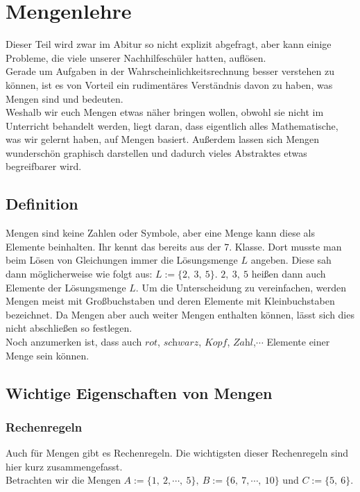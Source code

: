\section{Mengenlehre}
Dieser Teil wird zwar im Abitur so nicht explizit abgefragt, aber kann einige Probleme, die viele unserer Nachhilfeschüler hatten, auflösen.\\
Gerade um Aufgaben in der Wahrscheinlichkeitsrechnung besser verstehen zu können, ist es von Vorteil ein rudimentäres Verständnis davon zu haben, was Mengen sind und bedeuten.\\
Weshalb wir euch Mengen etwas näher bringen wollen, obwohl sie nicht im Unterricht behandelt werden, liegt daran, dass eigentlich alles Mathematische, was wir gelernt haben, auf Mengen basiert. Außerdem lassen sich Mengen wunderschön graphisch darstellen und dadurch vieles Abstraktes etwas begreifbarer wird.

\subsection{Definition}
Mengen sind keine Zahlen oder Symbole, aber eine Menge kann diese als Elemente beinhalten. Ihr kennt das bereits aus der 7. Klasse. Dort musste man beim Lösen von Gleichungen immer die Lösungsmenge $L$ angeben. Diese sah dann möglicherweise wie folgt aus: $L:=\{2,\ 3,\ 5\}$. $2,\ 3,\ 5$ heißen dann auch Elemente der Lösungsmenge $L$. Um die Unterscheidung zu vereinfachen, werden Mengen meist mit Großbuchstaben und deren Elemente mit Kleinbuchstaben bezeichnet. Da Mengen aber auch weiter Mengen enthalten können, lässt sich dies nicht abschließen so festlegen.\\
Noch anzumerken ist, dass auch $\textit{rot}$, $\textit{schwarz}$, $\textit{Kopf}$, $\textit{Zahl}$,$\cdots$ Elemente einer Menge sein können.\\

\subsection{Wichtige Eigenschaften von Mengen}
\subsubsection{Rechenregeln}$ $\\
Auch für Mengen gibt es Rechenregeln. Die wichtigsten dieser Rechenregeln sind hier kurz zusammengefasst.\\
Betrachten wir die Mengen $A:=\{1,\ 2,\cdots,\ 5\},\ B:=\{6,\ 7,\cdots,\ 10\}$ und $C:=\{5,\ 6\}$.
